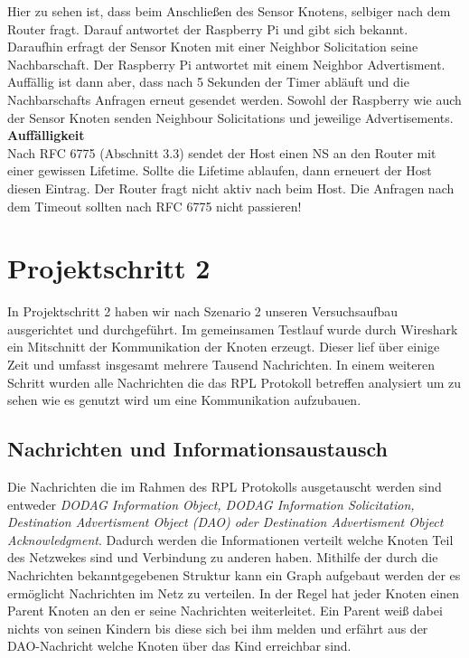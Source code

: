 \documentclass[]{scrartcl}
\begin{document}
Hier zu sehen ist, dass beim Anschließen des Sensor Knotens, selbiger nach dem Router fragt. Darauf antwortet der Raspberry Pi und gibt sich bekannt. Daraufhin erfragt der Sensor Knoten mit einer Neighbor Solicitation seine Nachbarschaft. Der Raspberry Pi antwortet mit einem Neighbor Advertisment. Auffällig ist dann aber, dass nach 5 Sekunden der Timer abläuft und die Nachbarschafts Anfragen erneut gesendet werden. Sowohl der Raspberry wie auch der Sensor Knoten senden Neighbour Solicitations und jeweilige Advertisements.\\

\textbf{Auffälligkeit}\\
Nach RFC 6775 (Abschnitt 3.3) sendet der Host einen NS an den Router mit einer gewissen Lifetime. Sollte die Lifetime ablaufen, dann erneuert der Host diesen Eintrag. Der Router fragt nicht aktiv nach beim Host. Die Anfragen nach dem Timeout sollten nach RFC 6775 nicht passieren!


\section{Projektschritt 2}
In Projektschritt 2 haben wir nach Szenario 2 unseren Versuchsaufbau ausgerichtet und durchgeführt. Im gemeinsamen Testlauf wurde durch Wireshark ein Mitschnitt der Kommunikation der Knoten erzeugt. Dieser lief über einige Zeit und umfasst insgesamt mehrere Tausend Nachrichten. In einem weiteren Schritt wurden alle Nachrichten die das RPL Protokoll betreffen analysiert um zu sehen wie es genutzt wird um eine Kommunikation aufzubauen. 

\subsection{Nachrichten und Informationsaustausch}
Die Nachrichten die im Rahmen des RPL Protokolls ausgetauscht werden sind entweder \textit{DODAG Information Object, DODAG Information Solicitation, Destination Advertisment Object (DAO) oder Destination Advertisment Object Acknowledgment}. Dadurch werden die Informationen verteilt welche Knoten Teil des Netzwekes sind und Verbindung zu anderen haben. Mithilfe der durch die Nachrichten bekanntgegebenen Struktur kann ein Graph aufgebaut werden der es ermöglicht Nachrichten im Netz zu verteilen. In der Regel hat jeder Knoten einen Parent Knoten an den er seine Nachrichten weiterleitet. Ein Parent weiß dabei nichts von seinen Kindern bis diese sich bei ihm melden und erfährt aus der DAO-Nachricht welche Knoten über das Kind erreichbar sind.
\end{document}
